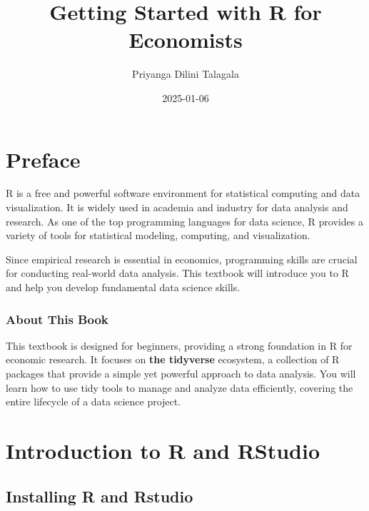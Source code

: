 \documentclass[
  letterpaper,
  DIV=11,
  numbers=noendperiod]{scrreprt}
\title{Getting Started with R for Economists}
\author{Priyanga Dilini Talagala}
\date{2025-01-06}
\renewcommand*\contentsname{Table of contents}
\newcommand\contentsname{Table of contents}
\begin{document}
\maketitle

\renewcommand*\contentsname{Table of contents}
{
\hypersetup{linkcolor=}
\setcounter{tocdepth}{2}
\tableofcontents
}


\chapter*{Preface}\label{preface}


R is a free and powerful software environment for statistical computing
and data visualization. It is widely used in academia and industry for
data analysis and research. As one of the top programming languages for
data science, R provides a variety of tools for statistical modeling,
computing, and visualization.

Since empirical research is essential in economics, programming skills
are crucial for conducting real-world data analysis. This textbook will
introduce you to R and help you develop fundamental data science skills.

\subsection*{\texorpdfstring{\textbf{About This
Book}}{About This Book}}\label{about-this-book}

This textbook is designed for beginners, providing a strong foundation
in R for economic research. It focuses on \textbf{the tidyverse}
ecosystem, a collection of R packages that provide a simple yet powerful
approach to data analysis. You will learn how to use tidy tools to
manage and analyze data efficiently, covering the entire lifecycle of a
data science project.


\chapter{Introduction to R and
RStudio}\label{introduction-to-r-and-rstudio}

\section{Installing R and Rstudio}\label{installing-r-and-rstudio}
\end{document}
